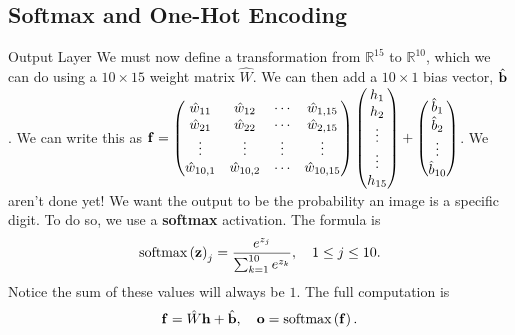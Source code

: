 \documentclass[xcolor=dvipsnames, fontsize=11pt, %
pagesize, %
parskip=half-, t]{beamer}
\begin{document}
\subsection{Softmax and One-Hot Encoding}
\begin{frame}{Output Layer}
We must now define a transformation from $\mathbb{R}^{15}$ to $\mathbb{R}^{10}$, which we can do using a $10\times 15$ weight matrix $\hat{W}$. We can then add a $10\times 1$ bias vector, $\hat{\bold{b}}$.  We can write this as $\bold{f}=\begin{pmatrix} \hat{w}_{11} & \hat{w}_{12} & \cdots & \hat{w}_{1,15} \\ \hat{w}_{21} & \hat{w}_{22} & \cdots & \hat{w}_{2,15} \\ \vdots & \vdots & \vdots & \vdots \\ \hat{w}_{10,1} & \hat{w}_{10,2} & \cdots & \hat{w}_{10,15} \end{pmatrix}\begin{pmatrix} h_{1} \\ h_2 \\ \vdots \\ \vdots \\ h_{15} \end{pmatrix}+\begin{pmatrix} \hat{b}_{1} \\ \hat{b}_2 \\ \vdots \\ \hat{b}_{10} \end{pmatrix}$.  We aren't done yet! We want the output to be the probability an image is a specific digit.  To do so, we use a \textbf{softmax} activation. The formula is $$\displaystyle \text{softmax}\left(\bold{z}\right)_{j}=\frac{e^{z_j}}{\sum_{k=1}^{10}e^{z_k}}, \quad 1\le j \le 10.$$ Notice the sum of these values will always be $1$.  The full computation is $$\bold{f}=\hat{W}\bold{h}+\hat{\bold{b}}, \quad \bold{o}=\text{softmax}\left(\bold{f}\right).$$  
  \end{frame}
\end{document}
